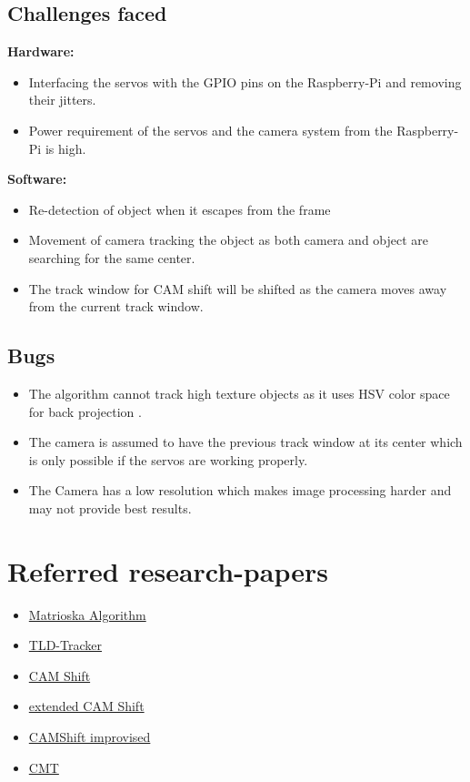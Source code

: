 \documentclass[a4paper,12pt,oneside]{book}
\begin{document}
\subsection{Challenges faced}
 \textbf{Hardware:}
 \begin{itemize}
  \item Interfacing the servos with the GPIO pins on the Raspberry-Pi and removing their jitters.
   \item Power requirement of the servos and the camera system from the Raspberry-Pi is high.
 \end{itemize}
 \vspace{0.3cm}
 \textbf{Software:}
 \begin{itemize}
     \item Re-detection of object when it escapes from the frame
     \item Movement of camera tracking the object as both camera and object are searching for the same center.
     \item The track window for CAM shift will be shifted as the camera moves away from the current track window.
 \end{itemize}
 \subsection{Bugs}
  \begin{itemize}
   \item The algorithm cannot track high texture objects as it uses HSV color space for back projection .
   \item The camera is assumed to have the previous track window at its center which is only possible if the servos are working properly.
   \item The Camera has a low resolution which makes image processing harder and may not provide best results.
  \end{itemize}
 \section{Referred research-papers}
 \begin{itemize}
     \item \href{http://www.cv-foundation.org/openaccess/content_cvpr_workshops_2014/W18/papers/Maresca_The_Matrioska_Tracking_2014_CVPR_paper.pdf}{Matrioska Algorithm}
     \item \href{http://kahlan.eps.surrey.ac.uk/featurespace/tld/Publications/2011_tpami}{TLD-Tracker}
     \item \href{http://www.jku.at/cg/content/e60566/e155475/e155539/FRCAMShift.pdf}{CAM Shift}
     \item \href{https://e-pub.uni-weimar.de/opus4/files/1410/CAMSHift.pdf}{extended CAM Shift}
     \item \href{http://isyou.info/inpra/papers/inpra-v2n2-05.pdf}{CAMShift improvised}
     \item \href{http://www.gnebehay.com/cmt/}{CMT}
 \end{itemize}
  
\end{document}
